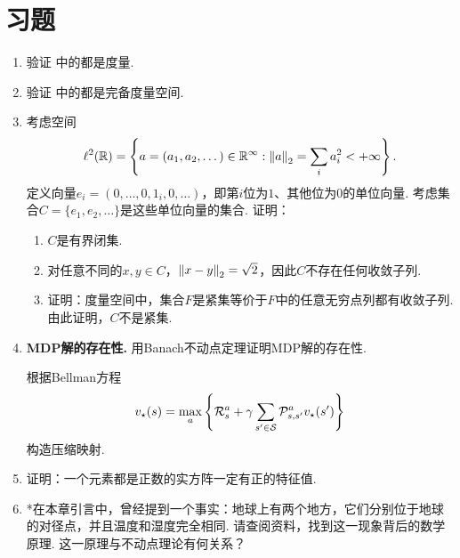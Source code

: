 \section{习题}

\begin{enumerate}[wide, labelindent=0pt]
    \item \label{exercise:metric} 验证 中的都是度量. 
    
    \item \label{exercise:complete-metric-space} 验证 中的都是完备度量空间. 
    
    \item \label{exercise:compact-not-bounded-closed} 考虑空间
    \[\ell^2(\mathbb{R})=\left\{a=(a_1,a_2,\dots)\in\mathbb{R}^{\infty}:\left\|a\right\|_2=\sum_{i}a_i^2<+\infty\right\}.\]
    定义向量$e_i=(0,\dots,0,1_i,0,\dots)$，即第$i$位为$1$、其他位为$0$的单位向量. 考虑集合$C=\{e_1,e_2,\dots\}$是这些单位向量的集合. 证明：
    \begin{enumerate}
        \item $C$是有界闭集. 
        \item 对任意不同的$x,y\in C$，$\left\|x-y\right\|_2=\sqrt{2}$，因此$C$不存在任何收敛子列. 
        \item 证明：度量空间中，集合$F$是紧集等价于$F$中的任意无穷点列都有收敛子列. 由此证明，$C$不是紧集. 
    \end{enumerate}

    \item \label{exercise:MDP-fixed-point} \textbf{MDP解的存在性. }用Banach不动点定理证明MDP解的存在性.
    \begin{hint}
    根据Bellman方程
    \[
        v_\star(s) = \max_a\left\{\mathcal R_s^a + \gamma \sum_{s'\in \mathcal S}\mathcal P_{s,s'}^av_\star(s')\right\}
    \]
    构造压缩映射.
    \end{hint}

    \item \label{exercise:positive-eigenvalue} 证明：一个元素都是正数的实方阵一定有正的特征值.

    \item *在本章引言中，曾经提到一个事实：地球上有两个地方，它们分别位于地球的对径点，并且温度和湿度完全相同. 请查阅资料，找到这一现象背后的数学原理. 这一原理与不动点理论有何关系？

\end{enumerate}
